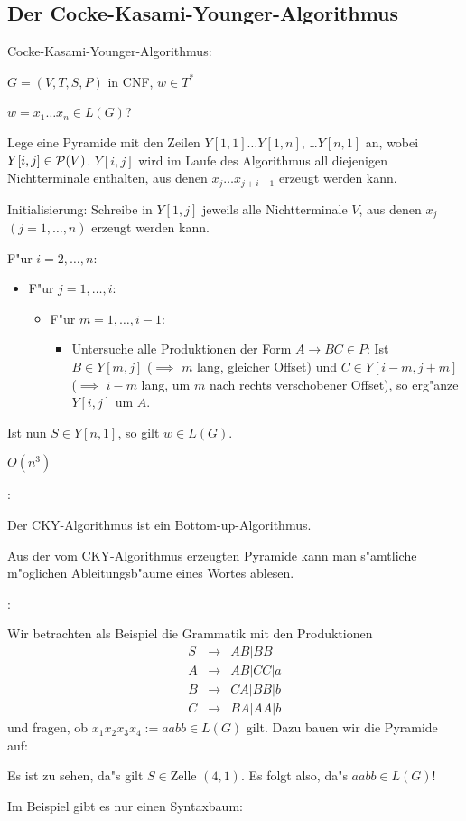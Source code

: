 \subsection{Der Cocke-Kasami-Younger-Algorithmus}
\algorithm Cocke-Kasami-Younger-Algorithmus:{
  \given $G=(V,T,S,P)$ in CNF, $w\in T^*$
  
  \aim $w=x_1\ldots x_n\in L(G)$?
  
  \begin{proc}
    \item Lege eine Pyramide mit den Zeilen 
      $Y[1,1]\ldots Y[1,n]$, \dots $Y[n,1]$
      an, wobei $Y[i,j]\in \cal P(V)$.
      $Y[i,j]$ wird im Laufe des Algorithmus all diejenigen Nichtterminale
      enthalten, aus denen $x_j\ldots x_{j+i-1}$ erzeugt werden kann.
    \item Initialisierung: Schreibe in $Y[1,j]$ jeweils alle Nichtterminale
      $V$, aus denen $x_j$ $(j=1,\ldots,n)$ erzeugt werden kann.
    \item F"ur $i=2,\ldots,n$:\begin{itemize}
      \item F"ur $j=1,\ldots,i$:\begin{itemize}
        \item F"ur $m=1,\ldots,i-1$:\begin{itemize}
          \item Untersuche alle Produktionen der Form $A\to BC\in P$:
            Ist $B\in Y[m,j]$ ($\implies$ $m$ lang, gleicher Offset) und
	    $C\in Y[i-m,j+m]$ ($\implies$ $i-m$ lang, um $m$ nach rechts 
	    verschobener Offset), so erg"anze $Y[i,j]$ um $A$.
	  \end{itemize}
        \end{itemize}
      \end{itemize}
      \item Ist nun $S\in Y[n,1]$, so gilt $w\in L(G)$.
    \end{proc}

  \cpx $O(n^3)$
  }
\remark:{
  Der CKY-Algorithmus ist ein Bottom-up-Algorithmus.
  
  Aus der vom CKY-Algorithmus erzeugten Pyramide kann man s"amtliche
  m"oglichen Ableitungsb"aume eines Wortes ablesen.
  }
\example:{
  Wir betrachten als Beispiel die Grammatik mit den Produktionen
  \begin{eqnarray*}
    S & \to & AB | BB\\
    A & \to & AB | CC | a\\
    B & \to & CA | BB | b\\
    C & \to & BA | AA | b
    \end{eqnarray*}
  und fragen, ob $x_1x_2x_3x_4 := aabb \in L(G)$ gilt. Dazu bauen wir
  die Pyramide auf:
  
  Es ist zu sehen, da"s gilt $S \in \text{Zelle } (4, 1)$. Es folgt
  also, da"s $aabb \in L(G)$!
  
  Im Beispiel gibt es nur einen Syntaxbaum:
  
  }

